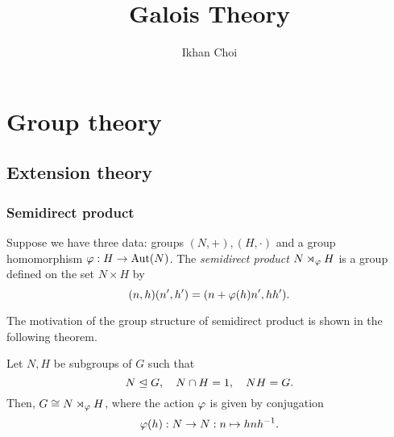 \documentclass{../note}
\begin{document}
\title{Galois Theory}
\author{Ikhan Choi}
\maketitle
\tableofcontents





\part{Group theory}
\iffalse
presentation
	quotient of a free group
	homomorphism 잡기
		free group을 정의역으로 먼저 잡고 well-defined 보여서 quotient로 내리기
	element들을 두 제너레이터로 표현하기
isomorphism 보이기
	isomorphism theorem
	order argument
subgroup criterion: 항등원, 역원, 닫힘 순으로 증명
centralizer, center, normalizer
	각 그룹의 계산 -> 기본적으로 노가다, 마지막에 라그랑지 확인
	센트럴라이저의 대칭성
	N(H)/C(H) 정리, G/Z(G)=Inn(G)
stabilizer


----------
#
액션, 실로우: existence, congruence condition
부분군격자: 1. 특정위수 부분군의 존재성, 2. 각 부분군의 컨쥬게이트 개수
	센트럴라이저의 크기를 잰다는 것 = conjugacy class of elemets 개수 세는 것
	노멀라이저의 크기를 잰다는 것 = conjugacy class of subgroups 개수 세는 것
	- 오더별 카운팅: 너무 많은 conjugate 배제하는 법
	- 인덱스: 푸앵카레 정리, least prime ind
	- 노말라이즈되는 부분군 잡아 노말라이저 띄우기
	케이스 나누기에 매우 좋은 조건을 제공
		노말 실로우 -> 바로 반직접곱
http://oeis.org/wiki/Number_of_groups_of_order_n

#
군 확장
컴포지션 시리즈의 이해
반직접: / 계산->아벨군의 자기동형군
중심적: 군코호몰로지 / 계산->보편계수정리

#
단순군: 단순군 아니기 테크닉, 단순군 보이기 테크닉, 교대군과 리타입 선형군

#
p군: 비자명센터, 개수 겁나많음
닐포턴트: 피팅, 프라티니
솔버블?
센트럴 시리즈?


\fi


\chapter{Extension theory}

\section{Semidirect product}
\begin{defn}
Suppose we have three data: groups $(N,+),(H,\cdot)$ and a group homomorphism $\varphi:H\to\operatorname{Aut}(N)$.
The \emph{semidirect product} $N\rtimes_\varphi H$ is a group defined on the set $N\times H$ by
\[(n,h)(n',h')=(n+\varphi(h)n',hh').\]
\end{defn}
The motivation of the group structure of semidirect product is shown in the following theorem.
\begin{thm}
Let $N,H$ be subgroups of $G$ such that
\[N\trianglelefteq G,\quad N\cap H=1,\quad NH=G.\]
Then, $G\cong N\rtimes_\varphi H$, where the action $\varphi$ is given by conjugation
\[\varphi(h):N\to N:n\mapsto hnh^{-1}.\]
\end{thm}
\end{document}
